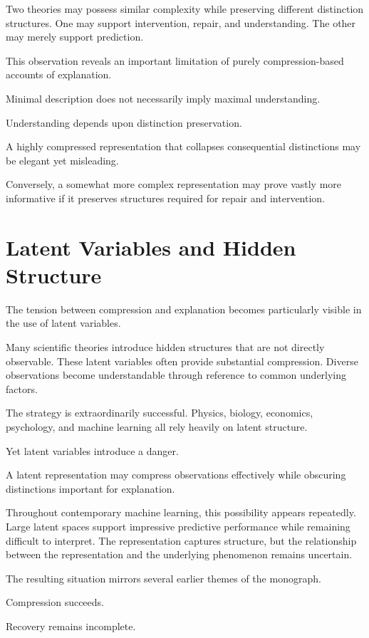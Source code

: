 \documentclass[11pt,oneside,openany]{book}
\begin{document}
Two theories may possess similar complexity while preserving different distinction structures. One may support intervention, repair, and understanding. The other may merely support prediction.

This observation reveals an important limitation of purely compression-based accounts of explanation.

Minimal description does not necessarily imply maximal understanding.

Understanding depends upon distinction preservation.

A highly compressed representation that collapses consequential distinctions may be elegant yet misleading.

Conversely, a somewhat more complex representation may prove vastly more informative if it preserves structures required for repair and intervention.

\section{Latent Variables and Hidden Structure}

The tension between compression and explanation becomes particularly visible in the use of latent variables.

Many scientific theories introduce hidden structures that are not directly observable. These latent variables often provide substantial compression. Diverse observations become understandable through reference to common underlying factors.

The strategy is extraordinarily successful. Physics, biology, economics, psychology, and machine learning all rely heavily on latent structure.

Yet latent variables introduce a danger.

A latent representation may compress observations effectively while obscuring distinctions important for explanation.

Throughout contemporary machine learning, this possibility appears repeatedly. Large latent spaces support impressive predictive performance while remaining difficult to interpret. The representation captures structure, but the relationship between the representation and the underlying phenomenon remains uncertain.

The resulting situation mirrors several earlier themes of the monograph.

Compression succeeds.

Recovery remains incomplete.
\end{document}
